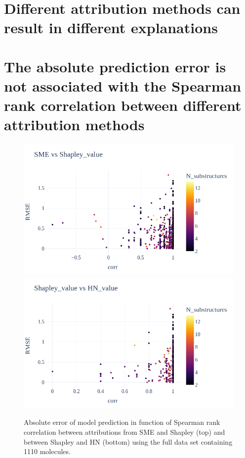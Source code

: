 \section{Different attribution methods can result in different explanations}







\section{The absolute prediction error is not associated with the Spearman rank correlation between different attribution methods}


\begin{figure}[h]
    \centering
    \includegraphics[scale=0.35]{../data/images/esol_rank_vs_AE_SME_Shapley_combined.png}
    \includegraphics[scale=0.35]{../data/images/esol_rank_vs_AE_Shapley_HN_combined.png}
    \caption{Absolute error of model prediction in function of Spearman rank correlation between 
        attributions from SME and Shapley (top) and between Shapley and HN (bottom) using the full 
        data set containing 1110 molecules.
    }
\end{figure}


